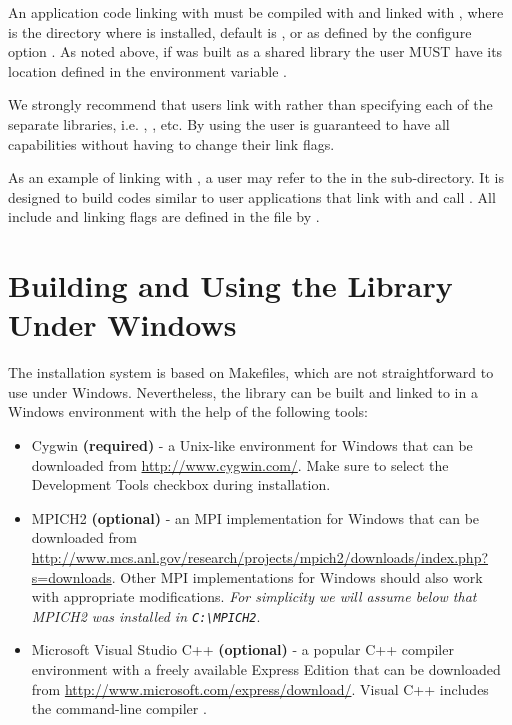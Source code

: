 An application code linking with \hypre{} must be compiled with
 and linked with , where
 is the directory where \hypre{} is installed, default is
, or as defined by the configure option . As
noted above, if \hypre{} was built as a shared library the user MUST have its
location defined in the environment variable .

We strongly recommend that users link with  rather than
specifying each of the separate \hypre{} libraries, i.e.
, , etc.  By using
 the user is guaranteed to have all capabilities without having
to change their link flags.

As an example of linking with \hypre{}, a user may refer to the 
in the  sub-directory.  It is designed to build codes similar to
user applications that link with and call \hypre{}.  All include and linking
flags are defined in the  file by .


\section{Building and Using the Library Under Windows} \label{sec-windows}

The \hypre{} installation system is based on Makefiles, which are not
straightforward to use under Windows. Nevertheless, the library can be built and
linked to in a Windows environment with the help of the following tools:

\begin{itemize}
\item Cygwin {\bf (required)} - a Unix-like environment for Windows that can be
  downloaded from \url{http://www.cygwin.com/}.  Make sure to select the
  Development Tools checkbox during installation.
\item MPICH2 {\bf (optional)} - an MPI implementation for Windows that can be
  downloaded from
  \url{http://www.mcs.anl.gov/research/projects/mpich2/downloads/index.php?s=downloads}.
  Other MPI implementations for Windows should also work with appropriate
  modifications. {\em For simplicity we will assume below that MPICH2 was
  installed in \verb|C:\MPICH2|}.
\item Microsoft Visual Studio C++ {\bf (optional)} - a popular C++ compiler
  environment with a freely available Express Edition that can be downloaded
  from \url{http://www.microsoft.com/express/download/}. Visual C++ includes the
  command-line compiler .
\end{itemize}

